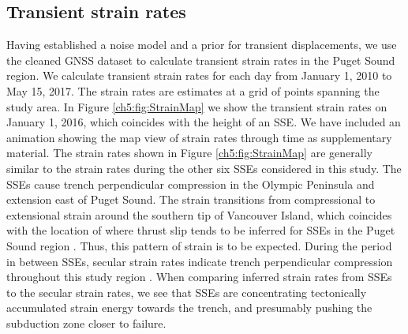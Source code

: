 \subsection{Transient strain rates}\label{ch5:sec:Results} 
Having established a noise model and a prior for transient displacements, we use the cleaned GNSS dataset to calculate transient strain rates in the Puget Sound region.  We calculate transient strain rates for each day from January 1, 2010 to May 15, 2017. The strain rates are estimates at a grid of points spanning the study area. In Figure \ref{ch5:fig:StrainMap} we show the transient strain rates on January 1, 2016, which coincides with the height of an SSE. We have included an animation showing the map view of strain rates through time as supplementary material. The strain rates shown in Figure \ref{ch5:fig:StrainMap} are generally similar to the strain rates during the other six SSEs considered in this study. The SSEs cause trench perpendicular compression in the Olympic Peninsula and extension east of Puget Sound. The strain transitions from compressional to extensional strain around the southern tip of Vancouver Island, which coincides with the location of where thrust slip tends to be inferred for SSEs in the Puget Sound region \citep[e.g.,][]{Dragert2001,Wech2009,Schmidt2010}. Thus, this pattern of strain is to be expected. During the period in between SSEs, secular strain rates indicate trench perpendicular compression throughout this study region \citep{Murray2000,McCaffrey2007,McCaffrey2013}. When comparing inferred strain rates from SSEs to the secular strain rates, we see that SSEs are concentrating tectonically accumulated strain energy towards the trench, and presumably pushing the subduction zone closer to failure. 


